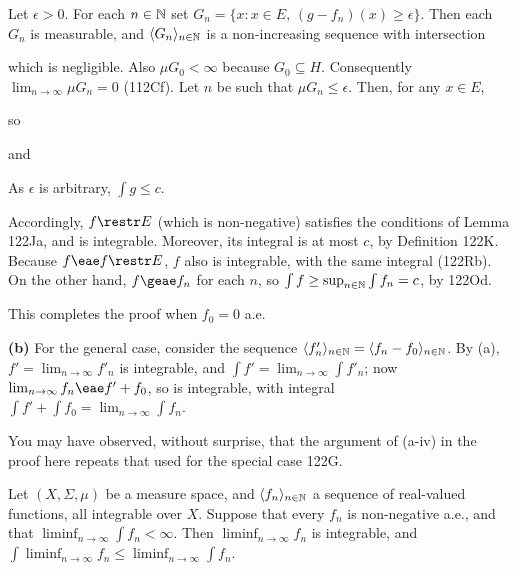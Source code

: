 {Let $\epsilon>0$.   For each $n\in\Bbb N$ set
$G_n=\{x:x\in E,\,(g-f_n) (x)\ge\epsilon\}$.
Then each $G_n$ is measurable, and $\langle G_n \rangle_{n\in\Bbb N}$
is a non-increasing sequence with intersection


\noindent which is negligible.
Also $\mu G_0<\infty$ because $G_0\subseteq H$.
Consequently $\lim_{n\to\infty}\mu G_n=0$ (112Cf).
Let $n$ be such that $\mu G_n\le\epsilon$.   Then, for any $x\in E$,


\noindent so


\noindent and


\noindent As $\epsilon$ is arbitrary, $\int g\le c$.

\medskip

 Accordingly, $f\restr E$ (which is non-negative)
satisfies the conditions of Lemma 122Ja,
and is integrable.   Moreover, its integral is at
most $c$, by Definition 122K.   Because $f\eae f\restr E$, $f$ also is
integrable, with the same integral (122Rb).   On the other hand,
$f\geae f_n$ for
each $n$, so $\int f\ge\sup_{n\in\Bbb N}\int f_n=c$, by 122Od.

This completes the proof when $f_0=0$ a.e.

\medskip

{\bf (b)} For the general case, consider the sequence
$\langle f'_n\rangle_{n\in\Bbb N}=\langle f_n-f_0\rangle_{n\in\Bbb N}$.
By (a),
$f'=\lim_{n\to\infty}f'_n$ is integrable, and $\int f'=\lim_{n\to\infty}
\int f'_n$;  now $\lim_{n\to\infty}f_n\eae f'+f_0$, so is
integrable, with integral $\int f'+\int f_0=\lim_{n\to\infty}\int f_n$.

\medskip

 You may have observed, without surprise, that the
argument of (a-iv) in the proof here repeats that used for the special
case 122G.
}%

 Let $(X,\Sigma,\mu)$ be a measure space,
and $\langle f_n\rangle_{n\in\Bbb N}$ a sequence of real-valued
functions, all integrable over $X$.   Suppose that every $f_n$ is
non-negative a.e., and
that $\liminf_{n\to\infty}\int f_n<\infty$.   Then $\liminf_{n\to\infty}
f_n$ is integrable, and
$\int\liminf_{n\to\infty}f_n\le\liminf_{n\to\infty}\int f_n$.

